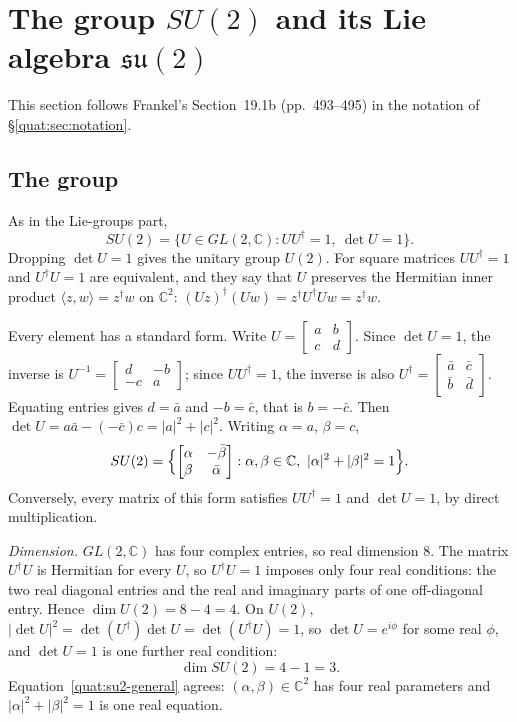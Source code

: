 \section{The group \texorpdfstring{$SU(2)$}{SU(2)} and its Lie algebra \texorpdfstring{$\mathfrak{su}(2)$}{su(2)}}\label{quat:sec:su2}
This section follows Frankel's Section~19.1b (pp.~493--495) in the
notation of \S\ref{quat:sec:notation}.

\subsection{The group}
As in the Lie-groups part,
\begin{equation}\label{quat:SU2-def}
 SU(2)=\{U\in GL(2,\mathbb C):UU^\dagger=1,\ \det U=1\}.
\end{equation}
Dropping $\det U=1$ gives the unitary group $U(2)$. For square matrices
$UU^\dagger=1$ and $U^\dagger U=1$ are equivalent, and they say that $U$
preserves the Hermitian inner product $\langle z,w\rangle=z^\dagger w$ on
$\mathbb C^2$: $(Uz)^\dagger(Uw)=z^\dagger U^\dagger Uw=z^\dagger w$.

Every element has a standard form. Write
$U=\begin{bmatrix}a&b\\c&d\end{bmatrix}$. Since $\det U=1$, the inverse is
$U^{-1}=\begin{bmatrix}d&-b\\-c&a\end{bmatrix}$; since $UU^\dagger=1$,
the inverse is also $U^\dagger=\begin{bmatrix}\bar a&\bar c\\
\bar b&\bar d\end{bmatrix}$. Equating entries gives $d=\bar a$ and
$-b=\bar c$, that is $b=-\bar c$. Then $\det U=a\bar a-(-\bar c)c
=|a|^2+|c|^2$. Writing $\alpha=a$, $\beta=c$,
\begin{equation}\label{quat:su2-general}
 SU(2)=\Bigl\{\begin{bmatrix}\alpha&-\bar\beta\\ \beta&\bar\alpha\end{bmatrix}
 :\alpha,\beta\in\mathbb C,\ |\alpha|^2+|\beta|^2=1\Bigr\}.
\end{equation}
Conversely, every matrix of this form satisfies $UU^\dagger=1$ and
$\det U=1$, by direct multiplication.

\emph{Dimension.} $GL(2,\mathbb C)$ has four complex entries, so real
dimension $8$. The matrix $U^\dagger U$ is Hermitian for every $U$, so
$U^\dagger U=1$ imposes only four real conditions: the two real diagonal
entries and the real and imaginary parts of one off-diagonal entry. Hence
$\dim U(2)=8-4=4$. On $U(2)$,
$|\det U|^2=\det(U^\dagger)\det U=\det(U^\dagger U)=1$, so
$\det U=e^{i\phi}$ for some real $\phi$, and $\det U=1$ is one further real
condition:
\begin{equation}\label{quat:dim-SU2}
 \dim SU(2)=4-1=3 .
\end{equation}
Equation~\eqref{quat:su2-general} agrees: $(\alpha,\beta)\in\mathbb C^2$
has four real parameters and $|\alpha|^2+|\beta|^2=1$ is one real equation.

